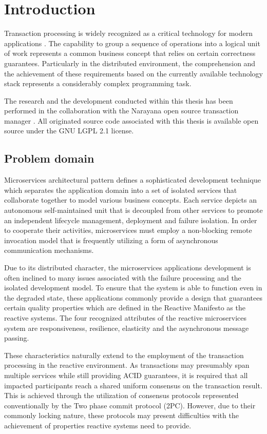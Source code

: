 \documentclass[oneside,
  digital, %
  table,   %
  nolof,     %
  nolot,     %
]{fithesis3}
\begin{document}
\chapter{Introduction}

Transaction processing is widely recognized as a critical technology for modern applications \cite{java_tran_processing}. The capability to group a sequence of operations into a logical unit of work represents a common business concept that relies on certain correctness guarantees.  Particularly in the distributed environment, the comprehension and the achievement of these requirements based on the currently available technology stack represents a considerably complex programming task.

The research and the development conducted within this thesis has been performed in the collaboration with the Narayana open source transaction manager \cite{narayana}. All originated source code associated with this thesis is available open source under the GNU LGPL 2.1 license.

\section{Problem domain}

Microservices architectural pattern defines a sophisticated development technique which separates the application domain into a set of isolated services that collaborate together to model various business concepts. Each service depicts an autonomous self-maintained unit that is decoupled from other services to promote an independent lifecycle management, deployment and failure isolation. In order to cooperate their activities, microservices must employ a non-blocking remote invocation model that is frequently utilizing a form of asynchronous communication mechanisms.

Due to its distributed character, the microservices applications development is often inclined to many issues associated with the failure processing and the isolated development model. To ensure that the system is able to function even in the degraded state, these applications commonly provide a design that guarantees certain quality properties which are defined in the Reactive Manifesto \cite{reactive_manifesto} as the reactive systems. The four recognized attributes of the reactive microservices system are responsiveness, resilience, elasticity and the asynchronous message passing.

These characteristics naturally extend to the employment of the transaction processing in the reactive environment. As transactions may presumably span multiple services while still providing ACID guarantees, it is required that all impacted participants reach a shared uniform consensus on the transaction result. This is achieved through the utilization of consensus protocols represented conventionally by the Two phase commit protocol (2PC). However, due to their commonly locking nature, these protocols may present difficulties with the achievement of properties reactive systems need to provide.
\end{document}
